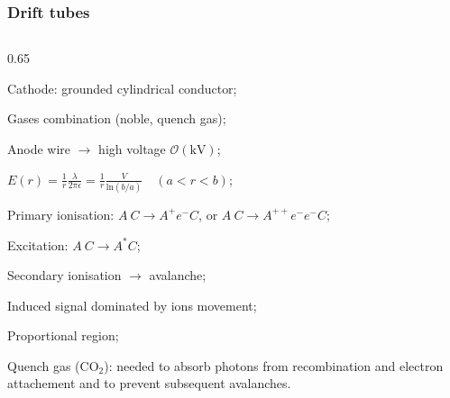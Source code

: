 \documentclass{beamer}
\begin{document}
\begin{frame}
    \frametitle{Drift tubes}
    \vspace{-4mm}
    \begin{columns}
        \begin{column}{0.65\framewidth}
            \setlength{\leftmargini}{1.1em}
            \begin{itemize}
               {\small \item Cathode: grounded cylindrical conductor;
               \vspace{1mm}
                \item Gases combination (noble, quench gas);
                \vspace{1mm}
                \item Anode wire $\rightarrow$ high voltage $\mathcal{O}(\text{kV})$; 
                \vspace{1mm}
                \item $E(r)=\frac{1}{r}\frac{\lambda}{2\pi \epsilon}=\frac{1}{r}\frac{V}{ \text{ln}(b/a)} \quad (a<r<b)$;
                \vspace{1mm}
                \item Primary ionisation: $A \ C \rightarrow A^+ e^- C$, or $A \ C \rightarrow A^{++} e^- e^- C$;
                \vspace{1mm}
                \item Excitation: $A \ C \rightarrow A^* C$;
                \vspace{1mm}
                \item Secondary ionisation $\rightarrow$ avalanche;
                \vspace{1mm}
                \item Induced signal dominated by ions movement;
                \vspace{1mm}
                \item Proportional region;
                \vspace{1mm}
                \item Quench gas (CO$_2$): needed to absorb photons from recombination and 
                electron attachement and to prevent subsequent 
                avalanches.
                
}
\end{itemize}
\end{column}
\end{columns}
\end{frame}
\end{document}
